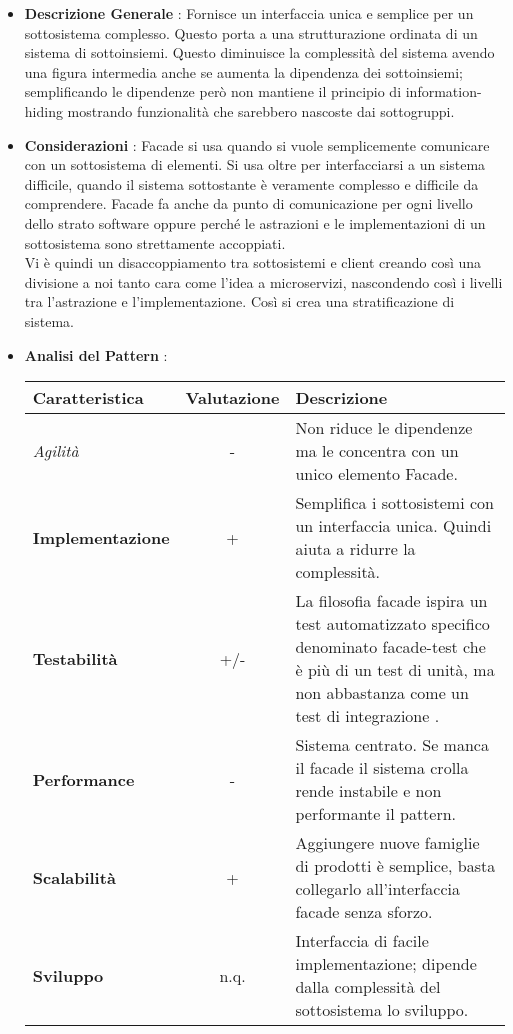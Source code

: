 {{{			\begin{itemize}\itemsep1pt
				\item \textbf{Descrizione Generale} : Fornisce un interfaccia unica e semplice per un sottosistema complesso. Questo porta a una strutturazione ordinata di un sistema di sottoinsiemi. Questo diminuisce la complessità del sistema avendo una figura intermedia anche se aumenta la dipendenza dei sottoinsiemi; semplificando le dipendenze però non mantiene il principio di information-hiding mostrando funzionalità che sarebbero nascoste dai sottogruppi.
				\item \textbf{Considerazioni} : Facade si usa quando si vuole semplicemente comunicare con un sottosistema di elementi. Si usa oltre per interfacciarsi a un sistema difficile, quando il sistema sottostante è veramente complesso e difficile da comprendere. Facade fa anche da punto di comunicazione per ogni livello dello strato software oppure perché le astrazioni e le implementazioni di un sottosistema sono strettamente accoppiati.\\
				Vi è quindi un disaccoppiamento tra sottosistemi e client creando così una divisione a noi tanto cara come l'idea a microservizi, nascondendo così i livelli tra l'astrazione e l'implementazione. Così si crea una stratificazione di sistema.
				\item \textbf{Analisi del Pattern} :
				\small %
				{\renewcommand\arraystretch{1.2} %
					\begin{tabular}{|l|c|l|}
						\hline
						{\textbf{Caratteristica}}&{\textbf{Valutazione}}&{\textbf{Descrizione}}\\
						\hline
						\textit{Agilità} & - & Non riduce le dipendenze ma le concentra con un unico elemento Facade. \\
						\hline
						\textbf{Implementazione} & + & Semplifica i sottosistemi con un interfaccia unica. Quindi aiuta a ridurre la complessità.  \\
						\hline
						\textbf{Testabilità} & +/- & La filosofia facade ispira un test automatizzato specifico denominato facade-test che è più di un test di unità, ma non abbastanza come un test di integrazione . \\
						\hline
						\textbf{Performance} & - & Sistema centrato. Se manca il facade il sistema crolla rende instabile e non performante il pattern. \\
						\hline
						\textbf{Scalabilità} & + & Aggiungere nuove famiglie di prodotti è semplice, basta collegarlo all'interfaccia facade senza sforzo. \\
						\hline
						\textbf{Sviluppo} & n.q. & Interfaccia di facile implementazione; dipende dalla complessità del sottosistema lo sviluppo. \\
						\hline
					\end{tabular}
				}
			\end{itemize}
		}
	}
}

